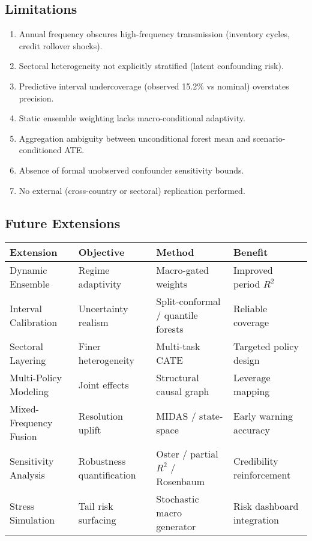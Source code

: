 \subsection{Limitations}
\begin{enumerate}
  \item Annual frequency obscures high-frequency transmission (inventory cycles, credit rollover shocks).
  \item Sectoral heterogeneity not explicitly stratified (latent confounding risk).
  \item Predictive interval undercoverage (observed 15.2\% vs nominal) overstates precision.
  \item Static ensemble weighting lacks macro-conditional adaptivity.
  \item Aggregation ambiguity between unconditional forest mean and scenario-conditioned ATE.
  \item Absence of formal unobserved confounder sensitivity bounds.
  \item No external (cross-country or sectoral) replication performed.
\end{enumerate}

\subsection{Future Extensions}
\begin{center}
\begin{tabular}{llll}
\toprule
Extension & Objective & Method & Benefit \\
\midrule
Dynamic Ensemble & Regime adaptivity & Macro-gated weights & Improved period $R^2$ \\
Interval Calibration & Uncertainty realism & Split-conformal / quantile forests & Reliable coverage \\
Sectoral Layering & Finer heterogeneity & Multi-task CATE & Targeted policy design \\
Multi-Policy Modeling & Joint effects & Structural causal graph & Leverage mapping \\
Mixed-Frequency Fusion & Resolution uplift & MIDAS / state-space & Early warning accuracy \\
Sensitivity Analysis & Robustness quantification & Oster / partial $R^2$ / Rosenbaum & Credibility reinforcement \\
Stress Simulation & Tail risk surfacing & Stochastic macro generator & Risk dashboard integration \\
\bottomrule
\end{tabular}
\end{center}

